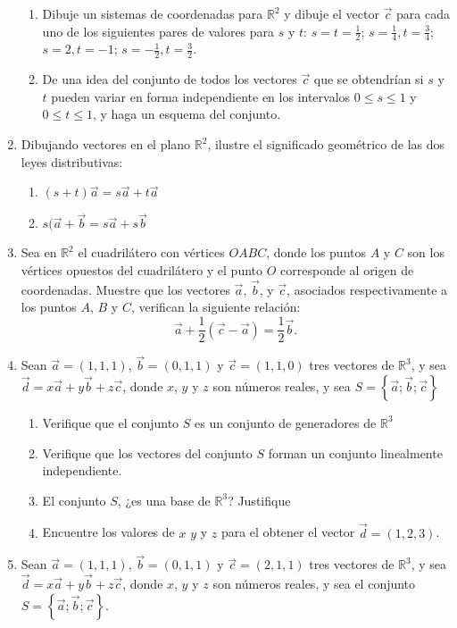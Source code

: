 \documentclass[a4paper,12pt]{article}
\begin{document}
\begin{enumerate}
    \begin{enumerate}
      \item Dibuje un sistemas de coordenadas para $\mathbb{R}^2$ y dibuje el vector $\vec c$ para cada uno de los siguientes pares de valores para $s$ y $t$: $s=t=\frac12$; $s=\frac14,t=\frac34$; $s=2, t=-1$;  $s=-\frac12,t=\frac32$.
      \item De una idea del conjunto de todos los vectores $\vec c$ que se obtendrían si $s$ y $t$ pueden variar en forma independiente en los intervalos $0 \leq s \leq 1$ y $0 \leq t \leq 1$, y haga un esquema del conjunto.
    \end{enumerate}
  \item Dibujando vectores en el plano $\mathbb R^2$, ilustre el significado geométrico de las dos leyes distributivas:
    \begin{enumerate}
      \item $(s+t) \vec a = s \vec a + t \vec a$
      \item $s (\vec a + \vec b= s \vec a + s \vec b$
    \end{enumerate}
  \item Sea en $\mathbb R^2$ el cuadrilátero con vértices $OABC$, donde los puntos $A$ y $C$ son los vértices opuestos del cuadrilátero y el punto $O$ corresponde al origen de coordenadas. Muestre que los vectores $\vec a$, $\vec b$, y $\vec c$, asociados respectivamente a los puntos $A$, $B$ y $C$, verifican la siguiente relación: \[\vec a + \frac12 \left ( \vec c - \vec a \right ) = \frac12 \vec b.\]
  \item Sean $\vec a=(1,1,1)$,  $\vec b=(0,1,1)$ y $\vec c=(1,1,0)$  tres vectores de $\mathbb{R}^3$, y sea $\vec d = x \vec a + y \vec b + z \vec c$, donde $x$, $y$ y $z$ son números reales, y sea $S=\left \{ \vec a; \vec b; \vec c \right \}$
    \begin{enumerate}
      \item Verifique que el conjunto $S$ es un conjunto de generadores de $\mathbb R^3$
      \item Verifique que los vectores del conjunto $S$ forman un conjunto linealmente independiente.
      \item El conjunto $S$, ¿es una base de $\mathbb R^3$? Justifique
      \item Encuentre los valores de $x$ $y$ y $z$ para el obtener el vector $\vec d = (1,2,3)$.
    \end{enumerate}
  \item Sean $\vec a=(1,1,1)$,  $\vec b=(0,1,1)$ y $\vec c=(2,1,1)$  tres vectores de $\mathbb{R}^3$, y sea $\vec d = x \vec a + y \vec b + z \vec c$, donde $x$, $y$ y $z$ son números reales, y sea el conjunto $S=\left \{ \vec a; \vec b; \vec c \right \}$.

\end{enumerate}
\end{document}
